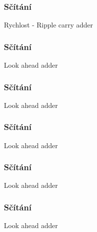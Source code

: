 \documentclass{beamer}
\begin{document}
\begin{frame}
\frametitle{Sčítání}

Rychlost - Ripple carry adder
\end{frame}

\begin{frame}
\frametitle{Sčítání}

Look ahead adder
\end{frame}

\begin{frame}
\frametitle{Sčítání}

Look ahead adder
\end{frame}

\begin{frame}
\frametitle{Sčítání}

Look ahead adder
\end{frame}

\begin{frame}
\frametitle{Sčítání}

Look ahead adder
\end{frame}

\begin{frame}
\frametitle{Sčítání}

Look ahead adder
\end{frame}
\end{document}
